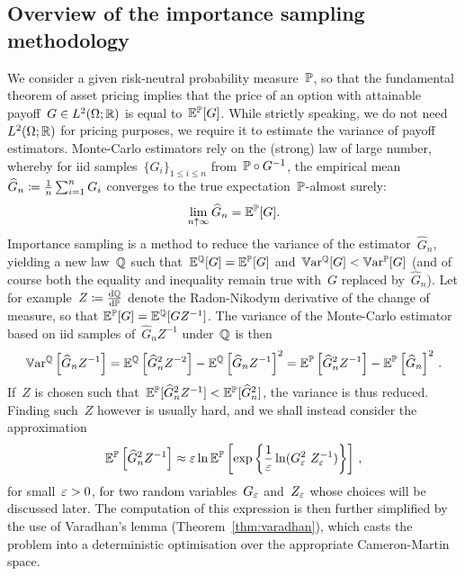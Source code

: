 \subsection{Overview of the importance sampling methodology}
We consider a given risk-neutral probability measure~$\mathbb{P}$, so that
the fundamental theorem of asset pricing
implies that the price of an option with  attainable payoff~$G\in L^2( \Omega;\mathbb{R})$ is equal to~$\mathbb{E}^{\mathbb{P}}[G]$. 
While strictly speaking, 
we do not need~$L^2(\Omega;\mathbb{R})$ for pricing purposes, we require it to estimate the variance of payoff estimators.
Monte-Carlo estimators rely on the (strong) law of large number, whereby for iid samples~$\{G_{i}\}_{1\leq i \leq n}$ from~$\mathbb{P} \circ G^{-1}$, 
the empirical mean~$\widehat{G}_n \coloneqq\frac{1}{n}\sum_{i=1}^{n}G_i$
converges to the true expectation~$\mathbb{P}$-almost surely:
$$
\lim_{n\uparrow \infty}\widehat{G}_n = \mathbb{E}^{\mathbb{P}}[G].
$$
Importance sampling is a method to reduce the variance of the estimator~$\widehat{G}_n$, yielding a new law~$\mathbb{Q}$ such that~$\mathbb{E}^{\mathbb{Q}}[G] = \mathbb{E}^{\mathbb{P}}[G]$
and~$ \mathbb{V}\mathrm{ar}^{\mathbb{Q}}[G] <  \mathbb{V}\mathrm{ar}^{\mathbb{P}}[G]$
(and of course both the equality and inequality remain true with~$G$ replaced by~$\widehat{G}_n$).
Let for example~$Z \coloneqq \frac{\mathrm{d}\mathbb{Q}}{\mathrm{d}\mathbb{P}}$ denote the Radon-Nikodym derivative of the change of measure, so that
$\mathbb{E}^{\mathbb{P}}[G] = \mathbb{E}^{\mathbb{Q}}[G Z^{-1}]$.								 
The variance of the Monte-Carlo estimator based on iid samples of~$\widehat{G}_n Z^{-1}$ under~$\mathbb{Q}$ is then
$$
 \mathbb{V}\mathrm{ar}^{\mathbb{Q}}\left[\widehat{G}_n Z^{-1}\right] 
 = \mathbb{E}^{\mathbb{Q}}\left[\widehat{G}_n^2 Z^{-2}\right]  - \mathbb{E}^{\mathbb{Q}}\left[\widehat{G}_n Z^{-1}\right]^2
 = \mathbb{E}^{\mathbb{P}}\left[\widehat{G}_n^2 Z^{-1}\right]  - \mathbb{E}^{\mathbb{P}}\left[\widehat{G}_n\right]^2\,.
$$
If~$Z$ is chosen such that~$\mathbb{E}^{\mathbb{P}}[\widehat{G}_n^2 Z^{-1}] < \mathbb{E}^{\mathbb{P}}[\widehat{G}_n^2]$, 
the variance is thus reduced.
Finding such~$Z$ however is usually hard, and  
we shall instead consider the approximation
\begin{equation}\label{eq:proxy}
\EE^{\PP}\left[\widehat{G}_n^2 Z^{-1}\right]
\approx \eps\ln \EE^{\PP}\left[\exp\left\{\frac{1}{\eps}\ln(G_{\eps}^2 \ Z_{\eps}^{-1})\right\}\right]\,, 
\end{equation}
for small~$\varepsilon>0$, for two random variables~$G_{\varepsilon}$ and~$Z_{\varepsilon}$ whose choices will be discussed later.
The computation of this expression is then further simplified by the use of Varadhan's lemma (Theorem~\ref{thm:varadhan}), which casts the problem into a deterministic optimisation over the appropriate Cameron-Martin space.

